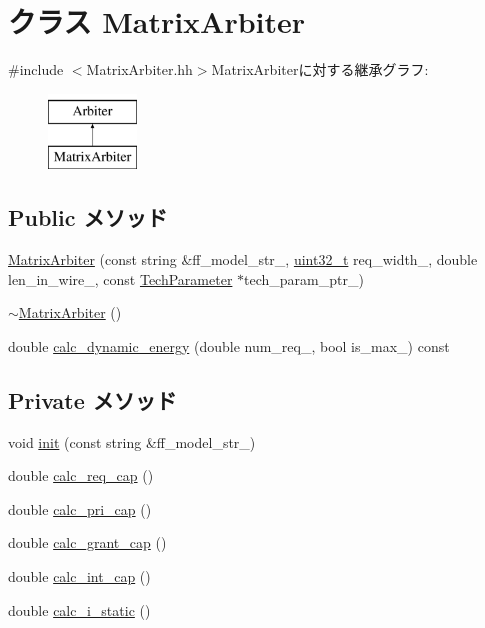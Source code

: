 \hypertarget{classMatrixArbiter}{
\section{クラス MatrixArbiter}
\label{classMatrixArbiter}
}


{\ttfamily \#include $<$MatrixArbiter.hh$>$}MatrixArbiterに対する継承グラフ:\begin{figure}[H]
\begin{center}
\leavevmode
\includegraphics[height=2cm]{classMatrixArbiter}
\end{center}
\end{figure}
\subsection*{Public メソッド}
\begin{DoxyCompactItemize}
\item 
\hyperlink{classMatrixArbiter_aca3381c7b32a94653b47781b359451f6}{MatrixArbiter} (const string \&ff\_\-model\_\-str\_\-, \hyperlink{Type_8hh_a435d1572bf3f880d55459d9805097f62}{uint32\_\-t} req\_\-width\_\-, double len\_\-in\_\-wire\_\-, const \hyperlink{classTechParameter}{TechParameter} $\ast$tech\_\-param\_\-ptr\_\-)
\item 
\hyperlink{classMatrixArbiter_a9f8fd0c5e60bc21f35c982d9a022b38c}{$\sim$MatrixArbiter} ()
\item 
double \hyperlink{classMatrixArbiter_adf7ecbfcfee50be4847889bf0bc725b1}{calc\_\-dynamic\_\-energy} (double num\_\-req\_\-, bool is\_\-max\_\-) const 
\end{DoxyCompactItemize}
\subsection*{Private メソッド}
\begin{DoxyCompactItemize}
\item 
void \hyperlink{classMatrixArbiter_aa30ab0383b17214d69595df443fe4223}{init} (const string \&ff\_\-model\_\-str\_\-)
\item 
double \hyperlink{classMatrixArbiter_ad328bcd6c4435aff24a79afd9ac8b978}{calc\_\-req\_\-cap} ()
\item 
double \hyperlink{classMatrixArbiter_ab7379d0e829c19b19c699f8bca018b9d}{calc\_\-pri\_\-cap} ()
\item 
double \hyperlink{classMatrixArbiter_a1ca031abb0d310b02168d439e1e858d2}{calc\_\-grant\_\-cap} ()
\item 
double \hyperlink{classMatrixArbiter_a16e2ab6e99c8b2e72fb306b6d6094699}{calc\_\-int\_\-cap} ()
\item 
double \hyperlink{classMatrixArbiter_a0027807356ac4ca07fe2e593234eb884}{calc\_\-i\_\-static} ()
\end{DoxyCompactItemize}

